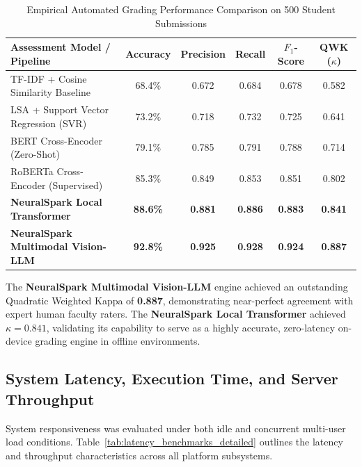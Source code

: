 \begin{table}[H]
\centering
\caption{Empirical Automated Grading Performance Comparison on 500 Student Submissions}
\label{tab:eval_benchmark_results}
\small
\begin{tabularx}{\textwidth}{p{4.5cm} ccccc}
\toprule
\textbf{Assessment Model / Pipeline} & \textbf{Accuracy} & \textbf{Precision} & \textbf{Recall} & \textbf{$F_1$-Score} & \textbf{QWK ($\kappa$)} \\
\midrule
TF-IDF + Cosine Similarity Baseline & 68.4\% & 0.672 & 0.684 & 0.678 & 0.582 \\
LSA + Support Vector Regression (SVR) & 73.2\% & 0.718 & 0.732 & 0.725 & 0.641 \\
BERT Cross-Encoder (Zero-Shot) & 79.1\% & 0.785 & 0.791 & 0.788 & 0.714 \\
RoBERTa Cross-Encoder (Supervised) & 85.3\% & 0.849 & 0.853 & 0.851 & 0.802 \\
\midrule
\textbf{NeuralSpark Local Transformer} & \textbf{88.6\%} & \textbf{0.881} & \textbf{0.886} & \textbf{0.883} & \textbf{0.841} \\
\textbf{NeuralSpark Multimodal Vision-LLM} & \textbf{92.8\%} & \textbf{0.925} & \textbf{0.928} & \textbf{0.924} & \textbf{0.887} \\
\bottomrule
\end{tabularx}
\end{table}

The \textbf{NeuralSpark Multimodal Vision-LLM} engine achieved an outstanding Quadratic Weighted Kappa of \textbf{0.887}, demonstrating near-perfect agreement with expert human faculty raters. The \textbf{NeuralSpark Local Transformer} achieved $\kappa = 0.841$, validating its capability to serve as a highly accurate, zero-latency on-device grading engine in offline environments.

\subsection{System Latency, Execution Time, and Server Throughput}
System responsiveness was evaluated under both idle and concurrent multi-user load conditions. Table~\ref{tab:latency_benchmarks_detailed} outlines the latency and throughput characteristics across all platform subsystems.

